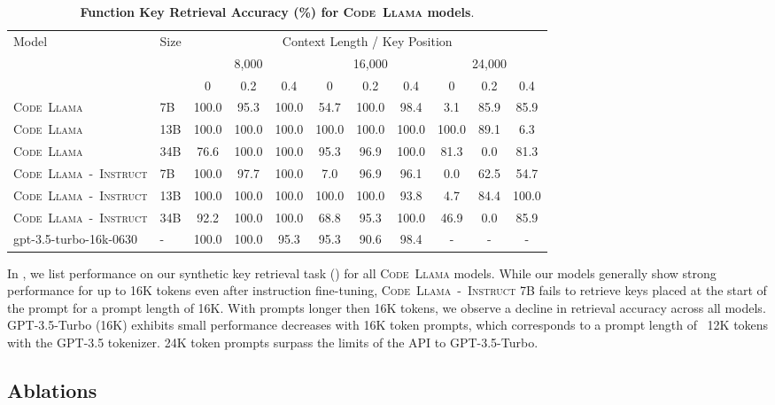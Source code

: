\documentclass[10pt]{article}
\newcommand{\model}{\textsc{Code~Llama}\xspace}
\newcommand{\instmodel}{\textsc{Code~Llama~-~Instruct}\xspace}
\begin{document}
\begin{table}[]
\centering
\begin{tabular}{ll|ccc|ccc|ccc}
\toprule
Model & Size & \multicolumn{9}{c}{{Context Length / Key Position}} \\
& & \multicolumn{3}{c}{8,000} & \multicolumn{3}{c}{16,000} & \multicolumn{3}{c}{24,000} \\
& & 0 & 0.2 & 0.4 & 0 & 0.2 & 0.4 & 0 & 0.2 & 0.4 \\
\midrule
\model & 7B  & 100.0 & 95.3 & 100.0 & 54.7 & 100.0 & 98.4 & 3.1 & 85.9 & 85.9 \\
\model & 13B & 100.0 & 100.0 & 100.0 & 100.0 & 100.0 & 100.0 & 100.0 & 89.1 & 6.3 \\
\model & 34B  & 76.6 & 100.0 & 100.0 & 95.3 & 96.9 & 100.0 & 81.3 & 0.0 & 81.3\\
\instmodel & 7B & 100.0 & 97.7 & 100.0 & 7.0 & 96.9 & 96.1 & 0.0 & 62.5 & 54.7 \\
\instmodel & 13B & 100.0 & 100.0 & 100.0 & 100.0 & 100.0 & 93.8 & 4.7 & 84.4 & 100.0  \\
\instmodel & 34B & 92.2 & 100.0 & 100.0 & 68.8 & 95.3 & 100.0 & 46.9 & 0.0 & 85.9 \\
gpt-3.5-turbo-16k-0630 & - & 100.0 & 100.0 & 95.3 & 95.3 & 90.6 & 98.4 & - & - & - \\
\bottomrule
\end{tabular}\caption{\textbf{Function Key Retrieval Accuracy (\%) for \model models}.
}
\label{tab:retrieval_results}
\end{table}

In , we list performance on our synthetic key retrieval task () for all \model models.
While our models generally show strong performance for up to 16K tokens even after instruction fine-tuning, \instmodel 7B fails to retrieve keys placed at the start of the prompt for a prompt length of 16K.
With prompts longer then 16K tokens, we observe a decline in retrieval accuracy across all models.
GPT-3.5-Turbo (16K) exhibits small performance decreases with 16K token prompts, which corresponds to a prompt length of ~12K tokens with the GPT-3.5 tokenizer.
24K token prompts surpass the limits of the API to GPT-3.5-Turbo.


\subsection{Ablations}
\end{document}
